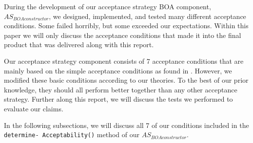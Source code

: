 During the development of our acceptance strategy BOA component, $AS_{BOAconstructor}$, we designed, implemented, and tested many different acceptance conditions. Some failed horribly, but some exceeded our expectations. Within this paper we will only discuss the acceptance conditions that made it into the final product that was delivered along with this report.

Our acceptance strategy component consists of 7 acceptance conditions that are mainly based on the simple acceptance conditions as found in \cite{baarslag2013acceptance}. However, we modified these basic conditions according to our theories. To the best of our prior knowledge, they should all perform better together than any other acceptance strategy. Further along this report, we will discuss the tests we performed to evaluate our claims.

In the following subsections, we will discuss all 7 of our conditions included in the \texttt{determine- Acceptability()} method of our $AS_{BOAconstructor}$.

